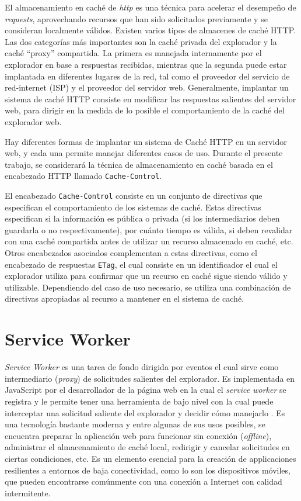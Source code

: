 El almacenamiento en caché de \textit{http} es una técnica para acelerar el desempeño de \textit{requests}, aprovechando recursos que han sido solicitados previamente y se consideran localmente válidos. Existen varios tipos de almacenes de caché HTTP. Las dos categorías más importantes son la caché privada del explorador y la caché ``proxy'' compartida. La primera es manejada internamente por el explorador en base a respuestas recibidas, mientras que la segunda puede estar implantada en diferentes lugares de la red, tal como el proveedor del servicio de red-internet (ISP) y el proveedor del servidor web. Generalmente, implantar un sistema de caché HTTP consiste en modificar las respuestas salientes del servidor web, para dirigir en la medida de lo posible el comportamiento de la caché del explorador web.

Hay diferentes formas de implantar un sistema de Caché HTTP en un servidor web, y cada una permite manejar diferentes casos de uso. Durante el presente trabajo, se considerará la técnica de almacenamiento en caché basada en el encabezado HTTP llamado \texttt{Cache-Control}.

El encabezado \texttt{Cache-Control} consiste en un conjunto de directivas que especifican el comportamiento de los sistemas de caché. Estas directivas especifican si la información es pública o privada (si los intermediarios deben guardarla o no respectivamente), por cuánto tiempo es válida, si deben revalidar con una caché compartida antes de utilizar un recurso almacenado en caché, etc. Otros encabezados asociados complementan a estas directivas, como el encabezado de respuestas \texttt{ETag}, el cual consiste en un identificador el cual el explorador utiliza para confirmar que un recurso en caché sigue siendo válido y utilizable. Dependiendo del caso de uso necesario, se utiliza una combinación de directivas apropiadas al recurso a mantener en el sistema de caché.

\section{Service Worker}

\textit{Service Worker} es una tarea de fondo dirigida por eventos el cual sirve como intermediario (\textit{proxy}) de solicitudes salientes del explorador. Es implementada en JavaScript por el desarrollador de la página web en la cual el \textit{service worker} se registra y le permite tener una herramienta de bajo nivel con la cual puede interceptar una solicitud saliente del explorador y decidir cómo manejarlo \cite{serviceworker}. Es una tecnología bastante moderna y entre algunas de sus usos posibles, se encuentra preparar la aplicación web para funcionar sin conexión (\textit{offline}), administrar el almacenamiento de caché local, redirigir y cancelar solicitudes en ciertas condiciones, etc. Es un elemento esencial para la creación de applicaciones resilientes a entornos de baja conectividad, como lo son los dispositivos móviles, que pueden encontrarse comúnmente con una conexíón a Internet con calidad intermitente.

